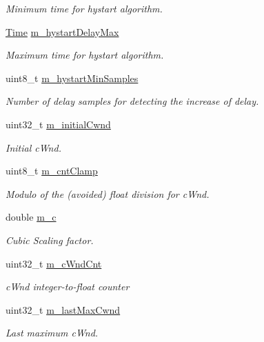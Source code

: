 \begin{DoxyCompactItemize}
\begin{DoxyCompactList}\small\item\em Minimum time for hystart algorithm. \end{DoxyCompactList}\item 
\hyperlink{classns3_1_1Time}{Time} \hyperlink{classns3_1_1TcpCubic_a1003aa1c760f12195ea62f0e86dbcfb4}{m\+\_\+hystart\+Delay\+Max}
\begin{DoxyCompactList}\small\item\em Maximum time for hystart algorithm. \end{DoxyCompactList}\item 
uint8\+\_\+t \hyperlink{classns3_1_1TcpCubic_ae86cb481bd166effae7227e90e9bafbb}{m\+\_\+hystart\+Min\+Samples}
\begin{DoxyCompactList}\small\item\em Number of delay samples for detecting the increase of delay. \end{DoxyCompactList}\item 
uint32\+\_\+t \hyperlink{classns3_1_1TcpCubic_adfc5ffb73bcdeb85814048a2adf01c1e}{m\+\_\+initial\+Cwnd}
\begin{DoxyCompactList}\small\item\em Initial c\+Wnd. \end{DoxyCompactList}\item 
uint8\+\_\+t \hyperlink{classns3_1_1TcpCubic_aafd8945276979821c592ac578746a708}{m\+\_\+cnt\+Clamp}
\begin{DoxyCompactList}\small\item\em Modulo of the (avoided) float division for c\+Wnd. \end{DoxyCompactList}\item 
double \hyperlink{classns3_1_1TcpCubic_acb9bb68447f9a9e0eb0cb1f95eb7aca7}{m\+\_\+c}
\begin{DoxyCompactList}\small\item\em Cubic Scaling factor. \end{DoxyCompactList}\item 
uint32\+\_\+t \hyperlink{classns3_1_1TcpCubic_a56b424a0e9790d9ef8b2b2ea6b399d49}{m\+\_\+c\+Wnd\+Cnt}
\begin{DoxyCompactList}\small\item\em c\+Wnd integer-\/to-\/float counter \end{DoxyCompactList}\item 
uint32\+\_\+t \hyperlink{classns3_1_1TcpCubic_adce8ab449a7a20e606b9021c4460b956}{m\+\_\+last\+Max\+Cwnd}
\begin{DoxyCompactList}\small\item\em Last maximum c\+Wnd. \end{DoxyCompactList}\item 

\end{DoxyCompactItemize}
